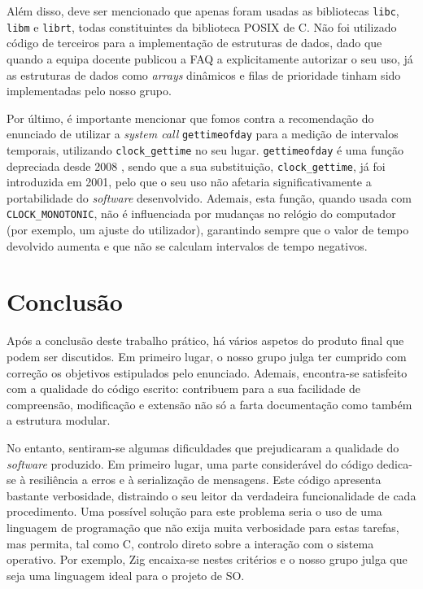 \documentclass[11pt]{article}
\begin{document}
Além disso, deve ser mencionado que apenas foram usadas as bibliotecas \texttt{libc}, \texttt{libm}
e \texttt{librt}, todas constituintes da biblioteca POSIX de C. Não foi utilizado código de
terceiros para a implementação de estruturas de dados, dado que quando a equipa docente publicou a
FAQ a explicitamente autorizar o seu uso, já as estruturas de dados como \emph{arrays} dinâmicos e
filas de prioridade tinham sido implementadas pelo nosso grupo.

Por último, é importante mencionar que fomos contra a recomendação do enunciado de utilizar a
\emph{system call} \texttt{gettimeofday} para a medição de intervalos temporais, utilizando
\texttt{clock\_gettime} no seu lugar. \texttt{gettimeofday} é uma função depreciada desde 2008
\cite{gettimeofday}, sendo que a sua substituição, \texttt{clock\_gettime}, já foi introduzida em
2001, pelo que o seu uso não afetaria significativamente a portabilidade do \emph{software}
desenvolvido. Ademais, esta função, quando usada com \texttt{CLOCK\_MONOTONIC}, não é influenciada
por mudanças no relógio do computador (por exemplo, um ajuste do utilizador), garantindo sempre que
o valor de tempo devolvido aumenta e que não se calculam intervalos de tempo negativos.
\cite{clock_gettime}

\section{Conclusão}

Após a conclusão deste trabalho prático, há vários aspetos do produto final que podem ser
discutidos. Em primeiro lugar, o nosso grupo julga ter cumprido com correção os objetivos
estipulados pelo enunciado. Ademais, encontra-se satisfeito com a qualidade do código escrito:
contribuem para a sua facilidade de compreensão, modificação e extensão não só a farta documentação
como também a estrutura modular.

No entanto, sentiram-se algumas dificuldades que prejudicaram a qualidade do \emph{software}
produzido. Em primeiro lugar, uma parte considerável do código dedica-se à resiliência a erros e à
serialização de mensagens. Este código apresenta bastante verbosidade, distraindo o seu leitor da
verdadeira funcionalidade de cada procedimento. Uma possível solução para este problema seria o uso
de uma linguagem de programação que não exija muita verbosidade para estas tarefas, mas permita, tal
como C, controlo direto sobre a interação com o sistema operativo. Por exemplo, Zig encaixa-se
nestes critérios e o nosso grupo julga que seja uma linguagem ideal para o projeto de SO.
\end{document}
